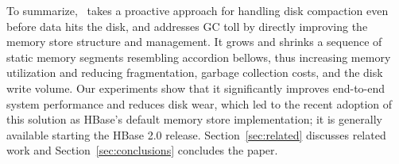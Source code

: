 To summarize, \sys\ takes a proactive approach for handling disk compaction even before data hits the disk, and addresses GC toll by directly improving the memory store structure and management.
It grows and shrinks a sequence of static memory segments resembling accordion bellows, 
thus increasing memory utilization and reducing fragmentation, garbage collection costs, and the disk write volume. 
Our experiments show that it significantly improves end-to-end system performance and reduces disk wear, 
which led to the recent adoption of this solution as HBase's default memory store implementation; it is generally available starting the HBase 2.0 release.
 Section~\ref{sec:related} discusses related work 
and Section~\ref{sec:conclusions} concludes the paper.

